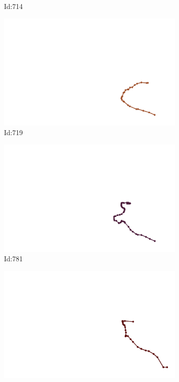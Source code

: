 \documentclass[12pt,twoside]{report}
\begin{document}
\begin{figure}
\begin{subfigure}[b]{0.20\textwidth}
\caption{Id:714}
\end{subfigure}
\begin{subfigure}[b]{0.20\textwidth}
\centering
\includegraphics[width=\textwidth]{../trajectories/719.png}
\caption{Id:719}
\end{subfigure}
\begin{subfigure}[b]{0.20\textwidth}
\centering
\includegraphics[width=\textwidth]{../trajectories/781.png}
\caption{Id:781}
\end{subfigure}
\begin{subfigure}[b]{0.20\textwidth}
\centering
\includegraphics[width=\textwidth]{../trajectories/799.png}

\end{subfigure}
\end{figure}
\end{document}
